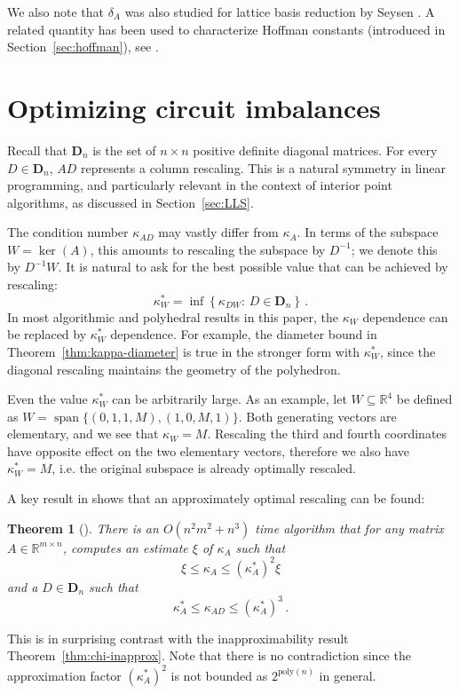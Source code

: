 \documentclass[11pt, a4paper]{article}
\newcommand{\Le}{\kappa}
\newcommand{\1}{\mathbbm{1}}
\newcommand{\spn}{\operatorname{span}}
\newcommand{\bD}{\mathbf{D}}
\newtheorem{theorem}{Theorem}[section]
\theoremstyle{case}
\newcommand{\R}{\mathbb{R}}
\begin{document}
We also note that $\delta_A$ was also studied  for lattice basis reduction by Seysen \cite{seysen1993}. A related quantity has been used to characterize Hoffman constants (introduced in Section~\ref{sec:hoffman}), see \cite{Guler1995,Klatte1995,Pena2020}.

 
\section{Optimizing circuit imbalances}
\label{subsec:def_chi_bar_star}
Recall that $\bD_n$ is the set of  $n\times n$ positive definite diagonal matrices. For  every $D\in \bD_n$, $AD$ represents a column rescaling. This is a natural symmetry in linear programming, and particularly relevant in the context of interior point algorithms, as discussed in Section~\ref{sec:LLS}.

 The condition number $\Le_{AD}$ may vastly differ from $\Le_{A}$. In terms of the subspace $W=\ker(A)$, this amounts to rescaling the subspace by $D^{-1}$; we denote this by $D^{-1}W$. It is natural to ask for the best possible value that can be achieved by rescaling:
\[
\Le_W^* = \inf\left\{ \Le_{DW}:\,  D \in \bD_n\right\}\, .
\]
In most algorithmic and polyhedral results in this paper, the $\Le_W$ dependence can be replaced by $\Le^*_W$ dependence. For example, the diameter bound in Theorem~\ref{thm:kappa-diameter} is true in the stronger form with $\Le^*_W$, since the diagonal rescaling maintains the geometry of the polyhedron.

Even the value $\Le^*_W$ can be arbitrarily large.
As an example, let $W\subseteq \R^4$ be defined as $W=\spn\{(0,1,1,M),(1,0,M,1)\}$. Both generating vectors are elementary, and we see that $\Le_W=M$. Rescaling the third and fourth coordinates have opposite effect on the two elementary vectors, therefore we also have $\Le_{W}^*=M$, i.e. the original subspace is already optimally rescaled.

A key result in  \cite{DHNV20} shows that an approximately optimal rescaling can be found:
\begin{theorem}[\cite{DHNV20}]\label{thm:bar-chi-star}
There is an $O(n^2m^2 + n^3)$ time algorithm that for any matrix $A\in\R^{m\times n}$, computes an estimate $\xi$ of $\kappa_A$ such that
\[
\xi \leq \kappa_A \leq  (\kappa_A^*)^2 \xi
\]
and a $D\in \bD_n$ such that
\[
\kappa^*_A\le \kappa_{AD}\le (\kappa_A^*)^3\, .
\]
\end{theorem}
This is in surprising contrast with the inapproximability result Theorem~\ref{thm:chi-inapprox}. 
Note that there is no contradiction since the approximation factor $(\kappa_A^*)^2$ is not bounded as $2^{\mathrm{poly}(n)}$ in general.
\end{document}

